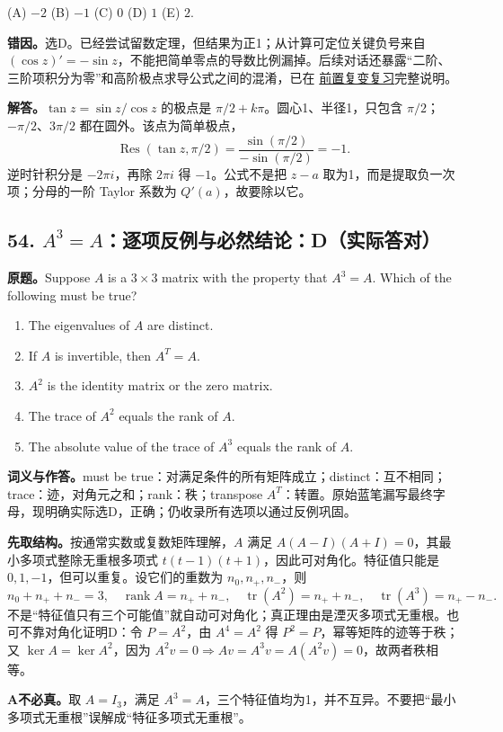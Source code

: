 \documentclass[11pt,a4paper,fontset=fandol]{ctexart}
\begin{document}
(A) $-2$ \quad (B) $-1$ \quad (C) $0$ \quad (D) $1$ \quad (E) $2$.

\textbf{错因。}选D。已经尝试留数定理，但结果为正1；从计算可定位关键负号来自 $(\cos z)'=-\sin z$，不能把简单零点的导数比例漏掉。后续对话还暴露“二阶、三阶项积分为零”和高阶极点求导公式之间的混淆，已在 \hyperref[review:residues]{前置复变复习}完整说明。

\textbf{解答。}$\tan z=\sin z/\cos z$ 的极点是 $\pi/2+k\pi$。圆心1、半径1，只包含 $\pi/2$；$-\pi/2$、$3\pi/2$ 都在圆外。该点为简单极点，
\[
\operatorname{Res}(\tan z,\pi/2)
=\frac{\sin(\pi/2)}{-\sin(\pi/2)}=-1.
\]
逆时针积分是 $-2\pi i$，再除 $2\pi i$ 得 $-1$。公式不是把 $z-a$ 取为1，而是提取负一次项；分母的一阶 Taylor 系数为 $Q'(a)$，故要除以它。

\subsection{54. $A^3=A$：逐项反例与必然结论：D（实际答对）}
\label{ms:q54}
\textbf{原题。}Suppose $A$ is a $3\times3$ matrix with the property that $A^3=A$. Which of the following must be true?
\begin{enumerate}[label=(\Alph*)]
\item The eigenvalues of $A$ are distinct.
\item If $A$ is invertible, then $A^T=A$.
\item $A^2$ is the identity matrix or the zero matrix.
\item The trace of $A^2$ equals the rank of $A$.
\item The absolute value of the trace of $A^3$ equals the rank of $A$.
\end{enumerate}
\textbf{词义与作答。}must be true：对满足条件的所有矩阵成立；distinct：互不相同；trace：迹，对角元之和；rank：秩；transpose $A^T$：转置。原始蓝笔漏写最终字母，现明确实际选D，正确；仍收录所有选项以通过反例巩固。

\textbf{先取结构。}按通常实数或复数矩阵理解，$A$ 满足 $A(A-I)(A+I)=0$，其最小多项式整除无重根多项式 $t(t-1)(t+1)$，因此可对角化。特征值只能是 $0,1,-1$，但可以重复。设它们的重数为 $n_0,n_+,n_-$，则
\[
n_0+n_++n_-=3,\quad
\operatorname{rank}A=n_++n_-,\quad
\operatorname{tr}(A^2)=n_++n_-,\quad
\operatorname{tr}(A^3)=n_+-n_-.
\]
不是“特征值只有三个可能值”就自动可对角化；真正理由是湮灭多项式无重根。也可不靠对角化证明D：令 $P=A^2$，由 $A^4=A^2$ 得 $P^2=P$，幂等矩阵的迹等于秩；又 $\ker A=\ker A^2$，因为 $A^2v=0\Rightarrow Av=A^3v=A(A^2v)=0$，故两者秩相等。

\textbf{A不必真。}取 $A=I_3$，满足 $A^3=A$，三个特征值均为1，并不互异。不要把“最小多项式无重根”误解成“特征多项式无重根”。
\end{document}
